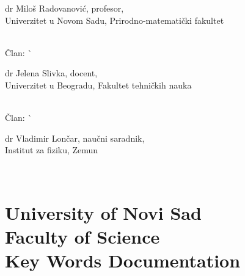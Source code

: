 \begin{tabbing}
\begin{minipage}[t]{.7\textwidth}
    dr Miloš Radovanović, profesor,\\
    Univerzitet u Novom Sadu, Prirodno-matematički fakultet
    \end{minipage}                                          \\
  Član:                    \`
    \begin{minipage}[t]{.7\textwidth}
    dr Jelena Slivka, docent,\\
    Univerzitet u Beogradu, Fakultet tehničkih nauka
    \end{minipage}                                          \\
  Član:                    \`
    \begin{minipage}[t]{.7\textwidth}
    dr Vladimir Lončar, naučni saradnik,\\
    Institut za fiziku, Zemun
    \end{minipage}                                          \\
\end{tabbing}

\chapter[Key Words Documentation]{\Large University of Novi Sad\\
          Faculty of Science\\
          Key Words Documentation}
 
